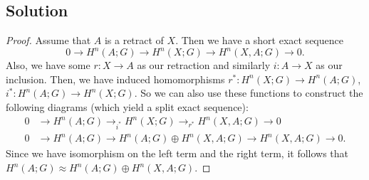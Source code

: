 \documentclass{article}
\theoremstyle{definition}
\begin{document}
\subsection*{Solution}
\begin{proof}
Assume that $A$ is a retract of $X$. Then we have a short exact sequence 
\[
    0 \to H^n(A;G) \to H^n(X;G) \to H^n(X,A;G) \to 0
.\]
Also, we have some $r:X \to A$ as our retraction and similarly $i:A \to X$ as our inclusion.
Then, we have induced homomorphisms $r^*: H^n(X;G) \to H^n(A;G)$,
$i^*: H^n(A;G) \to H^n(X;G)$. So we can also use these functions to construct 
the following diagrams (which yield a split exact sequence):
\begin{align*}
    0 &\longrightarrow H^n(A;G) \longrightarrow_{i^*} H^n(X;G) \longrightarrow_{r^*} H^n(X,A;G) \longrightarrow 0 \\
0 &\longrightarrow H^n(A;G) \rightarrow H^n(A;G) \oplus H^n(X,A;G) \longrightarrow H^n(X,A;G) \longrightarrow 0
.\end{align*}
Since we have isomorphism on the left term and the right term, it follows 
that $H^n(A;G) \approx H^n(A;G) \oplus H^n(X,A;G)$.
\end{proof}
\end{document}
